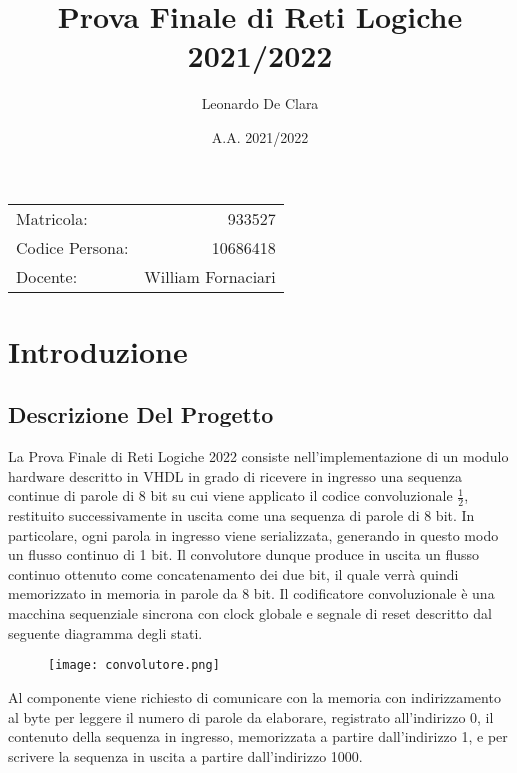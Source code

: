 \documentclass[a4paper]{article}
\begin{document}
\title{Prova Finale di Reti Logiche 2021/2022} %
\author{Leonardo De Clara} %
\date{A.A. 2021/2022}
\maketitle %
\begin{center}
\begin{tabular}{l r}
Matricola: & 933527\\ %
Codice Persona: & 10686418\\
Docente: & William Fornaciari	 %
\end{tabular}
\end{center}

\newpage

\tableofcontents
\newpage

\section{Introduzione}
\subsection{Descrizione Del Progetto}
La Prova Finale di Reti Logiche 2022 consiste nell'implementazione di un modulo hardware descritto in VHDL in grado di ricevere in ingresso una sequenza continue di parole di 8 bit su cui viene applicato il codice convoluzionale \begin{math}\frac{1}{2} \end{math}, restituito successivamente in uscita come una sequenza di parole di 8 bit.
\newline
In particolare, ogni parola in ingresso viene serializzata, generando in questo modo un flusso continuo di 1 bit. Il convolutore dunque produce in uscita un flusso continuo ottenuto come concatenamento dei due bit, il quale verrà quindi memorizzato in memoria in parole da 8 bit.
\newline 
Il codificatore convoluzionale è una macchina sequenziale sincrona con clock globale e segnale di reset descritto dal seguente diagramma degli stati.
\begin{figure}[h]
	\centering
	\texttt{[image: convolutore.png]}
\end{figure} 

Al componente viene richiesto di comunicare con la memoria con indirizzamento al byte per leggere il numero di parole da elaborare, registrato all'indirizzo 0, il contenuto della sequenza in ingresso, memorizzata a partire dall'indirizzo 1, e per scrivere la sequenza in uscita a partire dall'indirizzo 1000.
\newline
\end{document}
